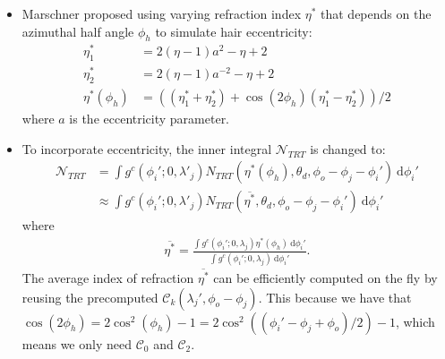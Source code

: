 \documentclass[10pt]{article}
\newcommand{\dee}{\mathrm{d}}
\newcommand{\azimint}{\mathcal{N}}
\begin{document}
  \begin{itemize}
    \item Marschner proposed using varying refraction index $\eta^*$ that depends on the azimuthal half angle $\phi_h$ to simulate hair eccentricity:
    \begin{align*}
      \eta^*_1 &= 2(\eta-1)a^2 - \eta + 2\\
      \eta^*_2 &= 2(\eta-1)a^{-2} - \eta + 2\\
      \eta^*(\phi_h) &= ((\eta^*_1 + \eta^*_2) + \cos(2\phi_h)(\eta^*_1 - \eta^*_2))/2
    \end{align*}
    where $a$ is the eccentricity parameter.
    
    \item To incorporate eccentricity, the inner integral $\azimint_{TRT}$ is changed to:
    \begin{align*}
      \azimint_{TRT} 
      &= \int g^c(\phi_i';0,\lambda'_j) N_{TRT}(\eta^*(\phi_h), \theta_d, \phi_o - \phi_j - \phi_i')\ \dee\phi_i'\\
      &\approx \int g^c(\phi_i';0,\lambda'_j) N_{TRT}(\overline{\eta^*}, \theta_d, \phi_o - \phi_j - \phi_i')\ \dee\phi_i'
    \end{align*}
    where
    \begin{align*}
      \overline{\eta^*} = \frac{\int g^c(\phi_i';0,\lambda_j) \eta^*(\phi_h)\ \dee \phi_i'}{\int g^c(\phi_i';0,\lambda_j)\ \dee \phi_i'}.
    \end{align*}
    The average index of refraction $\overline{\eta^*}$ can be efficiently computed on the fly by reusing the precomputed $\mathcal{C}_k(\lambda_j', \phi_o - \phi_j)$. This because we have that $\cos(2\phi_h) = 2\cos^2(\phi_h) - 1 = 2\cos^2((\phi_i' - \phi_j + \phi_o)/2) - 1$, which means we only need $\mathcal{C}_0$ and $\mathcal{C}_2$.
  \end{itemize}
  
  

	
\end{document}
